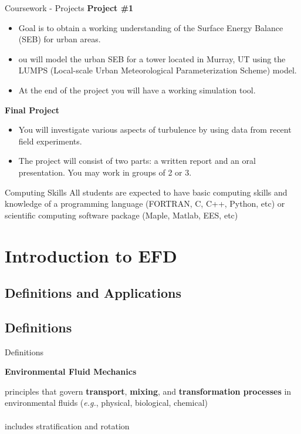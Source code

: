 \begin{frame}{Coursework - Projects}
\textbf{Project \#1}
\begin{itemize}
	\item Goal is to obtain a working understanding of the Surface Energy Balance (SEB) for urban areas. 
	\item ou will model the urban SEB for a tower located in Murray, UT using the LUMPS (Local-scale Urban Meteorological Parameterization Scheme) model. 
	\item At the end of the project you will have a working simulation tool.
\end{itemize}

\textbf{Final Project}
\begin{itemize}
	\item You will investigate various aspects of turbulence by using data from recent field experiments.
	\item The project will consist of two parts: a written report and an oral presentation. You may work in groups of 2 or 3.
\end{itemize}
\end{frame}


\begin{frame}{Computing Skills}
All students are expected to have basic computing skills and knowledge of a programming language (FORTRAN, C, C++, Python, etc) or scientific computing software package (Maple, Matlab, EES, etc)
\end{frame}

\section{Introduction to EFD} %
\subsection{Definitions and Applications}
\subsection*{Definitions}

\begin{frame}{Definitions}

{\large \textbf{Environmental Fluid Mechanics}}
\\\vspace{2pt}
\begin{fancydefs}
	principles that govern \textbf{transport}, \textbf{mixing}, and
	\textbf{transformation processes} in environmental fluids 
	(\textit{e.g.}, physical, biological, chemical)
	\\\\includes stratification and rotation
\end{fancydefs}
\end{frame}


